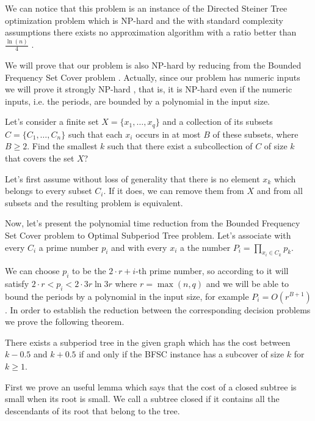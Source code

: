 We can notice that this problem is an instance of the Directed Steiner Tree optimization problem which is NP-hard and the with standard complexity assumptions there exists no approximation algorithm with a ratio better than $\frac {\ln (n)} 4$ \citep{zelikovsky1997series, ming2006fasterdsp}.

We will prove that our problem is also NP-hard by reducing from the Bounded Frequency Set Cover problem \citep{gary1979computers, cmulecture}. Actually, since our problem has numeric inputs we will prove it strongly NP-hard \citep{garey1978strong}, that is, it is NP-hard even if the numeric inputs, i.e. the periods, are bounded by a polynomial in the input size.

\begin{problem} Let's consider a finite set $X=\{x_1,\ldots,x_q\}$ and a collection of its subsets $C=\{C_1,\ldots, C_n\}$ such that each $x_i$ occurs in at most $B$ of these subsets, where $B \geq 2$. Find the smallest $k$ such that there exist a subcollection of $C$ of size $k$ that covers the set $X$?
\end{problem}

Let's first assume without loss of generality that there is no element $x_k$ which belongs to every subset $C_i$. If it does, we can remove them from $X$ and from all subsets and the resulting problem is equivalent.

Now, let’s present the polynomial time reduction from the Bounded Frequency Set Cover problem to Optimal Subperiod Tree problem. Let’s associate with every $C_i$ a prime number $p_i$ and with every $x_i$ a the number $P_i=\prod_{x_i\in C_k}p_k$.

We can choose $p_i$ to be the $2\cdot r+i$-th prime number, so according to \citep{jaroma2005upper} it will satisfy $2\cdot r <p_i<2\cdot 3r \ln 3r$ where $r=\max(n, q)$ and we will be able to bound the periods by a polynomial in the input size, for example $P_i=O(r^{B+1})$. In order to establish the reduction between the corresponding decision problems we prove the following theorem. 

\begin{theorem}\label{theorem}
There exists a subperiod tree in the given graph which has the cost between $k-0.5$ and $k+0.5$ if and only if the BFSC instance has a subcover of size $k$ for $k \ge  1$.
\end{theorem}

First we prove an useful lemma which says that the cost of a closed subtree is small when its root is small. We call a subtree closed if it contains all the descendants of its root that belong to the tree. 

